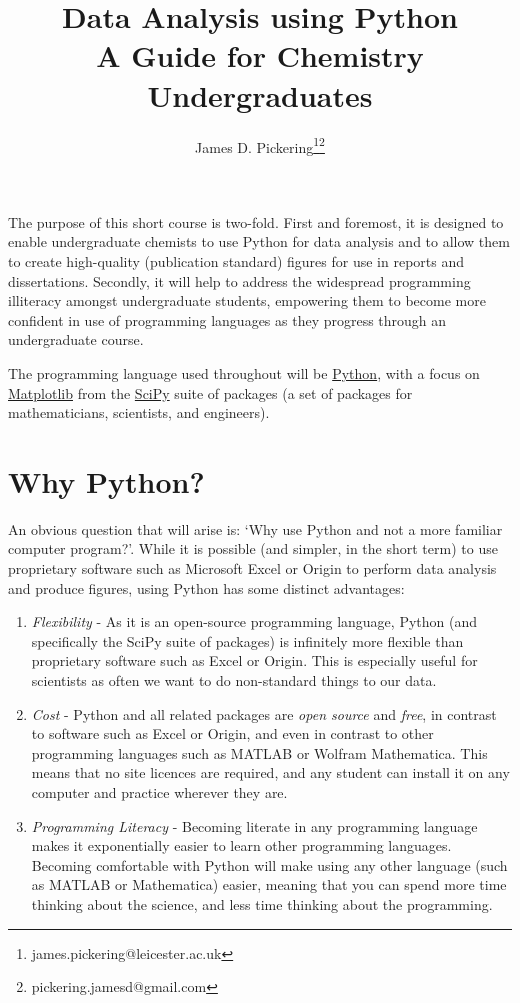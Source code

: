 \documentclass[10pt,a4paper]{memoir}
\title{{\Huge{Data Analysis using Python}}\\
{\large{A Guide for Chemistry Undergraduates}}}
\author{James D. Pickering\thanks{james.pickering@leicester.ac.uk}\thanks{pickering.jamesd@gmail.com}}
\begin{document}
\maketitle
The purpose of this short course is two-fold. First and foremost, it is designed to enable undergraduate chemists to use Python for data analysis and to allow them to create high-quality (publication standard) figures for use in reports and dissertations. Secondly, it will help to address the widespread programming illiteracy amongst undergraduate students, empowering them to become more confident in use of programming languages as they progress through an undergraduate course.  

The programming language used throughout will be \href{www.python.org}{Python}, with a focus on \href{www.matplotlib.org}{Matplotlib} from the \href{www.scipy.org}{SciPy} suite of packages (a set of packages for mathematicians, scientists, and engineers). 

\section*{Why Python?}
An obvious question that will arise is: `Why use Python and not a more familiar computer program?'. While it is possible (and simpler, in the short term) to use proprietary software such as Microsoft Excel or Origin to perform data analysis and produce figures, using Python has some distinct advantages:
\begin{enumerate}
	\item \emph{Flexibility} - As it is an open-source programming language, Python (and specifically the SciPy suite of packages) is infinitely more flexible than proprietary software such as Excel or Origin. This is especially useful for scientists as often we want to do non-standard things to our data. 
	\item \emph{Cost} - Python and all related packages are \emph{open source} and \emph{free}, in contrast to software such as Excel or Origin, and even in contrast to other programming languages such as MATLAB or Wolfram Mathematica. This means that no site licences are required, and any student can install it on any computer and practice wherever they are.
	\item \emph{Programming Literacy} - Becoming literate in any programming language makes it exponentially easier to learn other programming languages. Becoming comfortable with Python will make using any other language (such as MATLAB or Mathematica) easier, meaning that you can spend more time thinking about the science, and less time thinking about the programming.
\end{enumerate}
\end{document}
